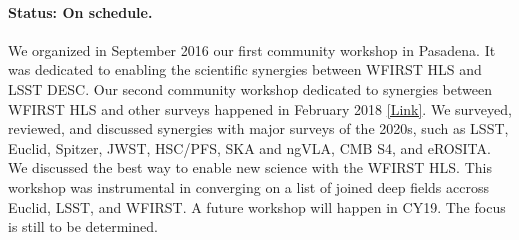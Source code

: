 \paragraph*{Status: On schedule.} We organized in September 2016 our first community workshop in Pasadena. It was dedicated to enabling the scientific synergies between WFIRST HLS and LSST DESC. Our second community workshop dedicated to synergies between WFIRST HLS and other surveys happened in February 2018 \href{http://www.wfirst-hls-cosmology.org/workshops/}{[Link]}. We surveyed, reviewed, and discussed synergies with major surveys of the 2020s, such as LSST, Euclid, Spitzer, JWST, HSC/PFS, SKA and ngVLA, CMB S4, and eROSITA. We discussed the best way to enable new science with the WFIRST HLS. This workshop was instrumental in converging on a list of joined deep fields accross Euclid, LSST, and WFIRST. A future workshop will happen in CY19. The focus is still to be determined.

